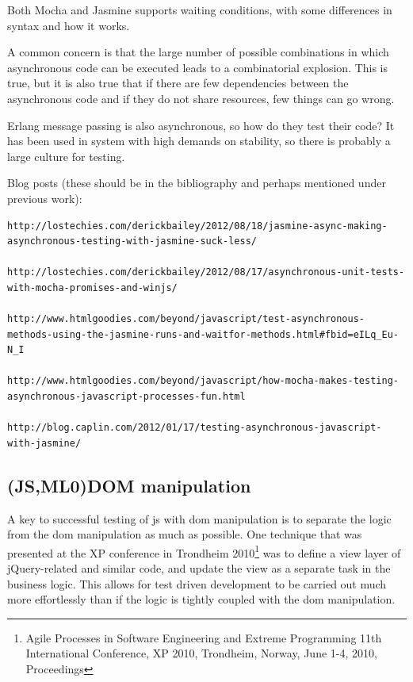 \documentclass[11pt]{article}
\begin{document}
Both Mocha and Jasmine supports waiting conditions, with some differences in syntax and how it works.

A common concern is that the large number of possible combinations in which asynchronous code can be executed leads to a combinatorial explosion. This is true, but it is also true that if there are few dependencies between the asynchronous code and if they do not share resources, few things can go wrong.

Erlang message passing is also asynchronous, so how do they test their code? It has been used in system with high demands on stability, so there is probably a large culture for testing.

Blog posts (these should be in the bibliography and perhaps mentioned under previous work):
\begin{verbatim}
http://lostechies.com/derickbailey/2012/08/18/jasmine-async-making-asynchronous-testing-with-jasmine-suck-less/

http://lostechies.com/derickbailey/2012/08/17/asynchronous-unit-tests-with-mocha-promises-and-winjs/

http://www.htmlgoodies.com/beyond/javascript/test-asynchronous-methods-using-the-jasmine-runs-and-waitfor-methods.html#fbid=eILq_Eu-N_I

http://www.htmlgoodies.com/beyond/javascript/how-mocha-makes-testing-asynchronous-javascript-processes-fun.html

http://blog.caplin.com/2012/01/17/testing-asynchronous-javascript-with-jasmine/
\end{verbatim}

\subsection{(JS,ML0)DOM manipulation}

A key to successful testing of \gls{js} with \gls{dom} manipulation is to separate the logic from the \gls{dom} manipulation as much as possible. One technique that was presented at the XP conference in Trondheim 2010\footnote{Agile Processes in Software Engineering and Extreme Programming 11th International Conference, XP 2010, Trondheim, Norway, June 1-4, 2010, Proceedings} was to define a view layer of jQuery-related and similar code, and update the view as a separate task in the business logic. This allows for test driven development to be carried out much more effortlessly than if the logic is tightly coupled with the \gls{dom} manipulation. \cite[question~4]{Ahnve}
\end{document}
